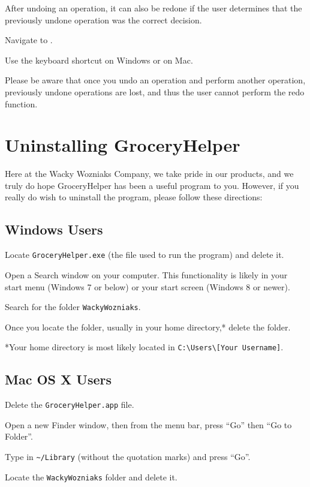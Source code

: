 \documentclass[letterpaper,12pt]{article}
\renewenvironment{enumerate}[1]{\begin{compactenum}#1}{\end{compactenum}}
\begin{document}
	After undoing an operation, it can also be redone if the user determines that the previously undone operation was the correct decision.
	
\begin{enumerate}
\item Navigate to .
\item Use the keyboard shortcut  on Windows or  on Mac.
\end{enumerate}	
	
Please be aware that once you undo an operation and perform another operation, previously undone operations are lost, and thus the user cannot perform the redo function.

\pagebreak

\section{Uninstalling GroceryHelper}

Here at the Wacky Wozniaks Company, we take pride in our products, and we truly do hope GroceryHelper has been a useful program to you. However, if you really do wish to uninstall the program, please follow these directions:

\subsection{Windows Users}

\begin{enumerate}
\item Locate \verb|GroceryHelper.exe| (the file used to run the program) and delete it.
\item Open a Search window on your computer. This functionality is likely in your start menu (Windows 7 or below) or your start screen (Windows 8 or newer).
\item Search for the folder \verb|WackyWozniaks|. 
\item Once you locate the folder, usually in your home directory,* delete the folder.   
\end{enumerate}

*Your home directory is most likely located in \verb|C:\Users\[Your Username]|. 

\subsection{Mac OS X Users}
\begin{enumerate}
\item Delete the \verb|GroceryHelper.app| file.
\item Open a new Finder window, then from the menu bar, press ``Go'' then ``Go to Folder''.
\item Type in \verb|~/Library| (without the quotation marks) and press ``Go''.
\item Locate the \verb|WackyWozniaks| folder and delete it.
\end{enumerate}
\end{document}
